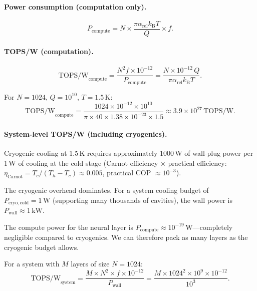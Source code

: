 \documentclass[11pt,twocolumn]{article}
\theoremstyle{definition}
\theoremstyle{remark}
\newcommand{\kB}{k_{\mathrm{B}}}
\begin{document}
\paragraph{Power consumption (computation only).}
\begin{equation}
P_{\mathrm{compute}} = N \times \frac{\pi\alpha_{\mathrm{rel}}\kB T}{Q} \times f.
\end{equation}

\paragraph{TOPS/W (computation).}
\begin{equation}
\mathrm{TOPS/W}_{\mathrm{compute}} = \frac{N^2 f \times 10^{-12}}{P_{\mathrm{compute}}}
= \frac{N \times 10^{-12}\,Q}{\pi\alpha_{\mathrm{rel}}\kB T}.
\label{eq:topsw_compute}
\end{equation}

For $N = 1024$, $Q = 10^{10}$, $T = 1.5\,\mathrm{K}$:
\begin{equation}
\mathrm{TOPS/W}_{\mathrm{compute}} = \frac{1024 \times 10^{-12} \times 10^{10}}{\pi \times 40 \times 1.38\times 10^{-23} \times 1.5}
\approx 3.9\times 10^{27}\,\mathrm{TOPS/W}.
\end{equation}

\paragraph{System-level TOPS/W (including cryogenics).}
Cryogenic cooling at 1.5\,K requires approximately 1000\,W of wall-plug
power per 1\,W of cooling at the cold stage (Carnot efficiency $\times$
practical efficiency: $\eta_{\mathrm{Carnot}} = T_c/(T_h - T_c) \approx
0.005$, practical COP $\approx 10^{-3}$).

The cryogenic overhead dominates. For a system cooling budget of
$P_{\mathrm{cryo,cold}} = 1\,\mathrm{W}$ (supporting many thousands of
cavities), the wall power is $P_{\mathrm{wall}} \approx 1\,\mathrm{kW}$.

The compute power for the neural layer is $P_{\mathrm{compute}} \approx
10^{-19}\,\mathrm{W}$---completely negligible compared to cryogenics. We
can therefore pack as many layers as the cryogenic budget allows.

For a system with $M$ layers of size $N = 1024$:
\begin{equation}
\mathrm{TOPS/W}_{\mathrm{system}} = \frac{M \times N^2 \times f \times 10^{-12}}{P_{\mathrm{wall}}}
= \frac{M \times 1024^2 \times 10^9 \times 10^{-12}}{10^3}.
\end{equation}
\end{document}
